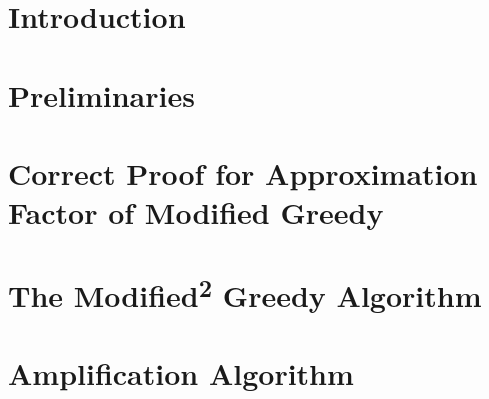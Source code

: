 \section{Introduction}


\section{Preliminaries}\label{sec:Preliminaries}


\section{Correct Proof for Approximation Factor of Modified Greedy}\label{sec:ModifiedGreedy}


\section{The Modified\textsuperscript{2} Greedy Algorithm}\label{sec:Modified2Greedy}


%

\section{Amplification Algorithm}\label{sec:Amplification}
 
